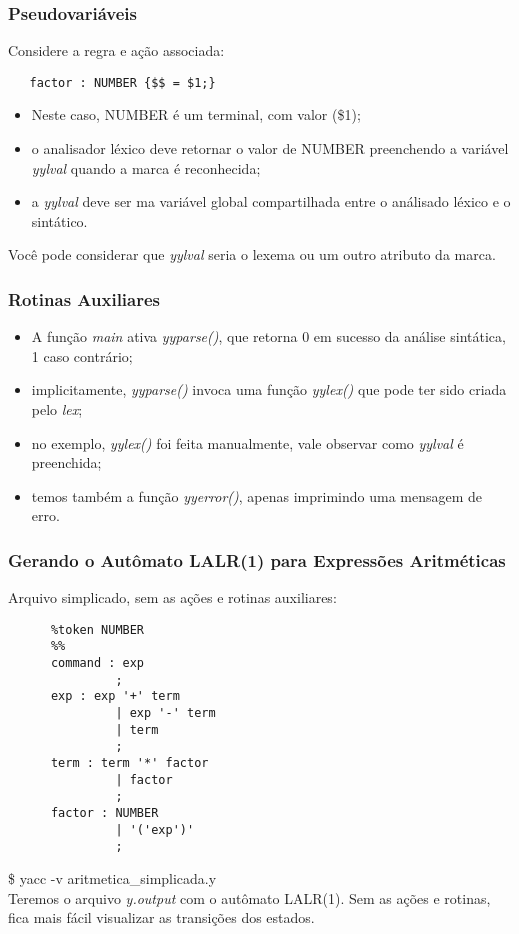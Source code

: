 \documentclass[table]{beamer}
\begin{document}
\begin{frame}[fragile]
   \frametitle{Pseudovariáveis}
   Considere a regra e ação associada:
   \begin{verbatim}
   factor : NUMBER {$$ = $1;}
   \end{verbatim}
   \begin{itemize}
      \item Neste caso, NUMBER é um terminal, com valor (\$1);
      \item o analisador léxico deve retornar o valor de NUMBER preenchendo a variável \textit{yylval} quando a marca é reconhecida;
      \item a \textit{yylval} deve ser ma variável global compartilhada entre o análisado léxico e o sintático.
   \end{itemize}
   Você pode considerar que \textit{yylval} seria o lexema ou um outro atributo da marca.
\end{frame}

\begin{frame}
   \frametitle{Rotinas Auxiliares}
   \begin{itemize}
      \item A função \textit{main} ativa \textit{yyparse()}, que retorna 0 em sucesso da análise sintática, 1 caso contrário;
      \item implicitamente, \textit{yyparse()} invoca uma função \textit{yylex()} que pode ter sido criada pelo \textit{lex};
      \item no exemplo, \textit{yylex()} foi feita manualmente, vale observar como \textit{yylval} é preenchida;
      \item temos também a função \textit{yyerror()}, apenas imprimindo uma mensagem de erro.
   \end{itemize}
\end{frame}

\begin{frame} [fragile]
   \frametitle{Gerando o Autômato LALR(1) para Expressões Aritméticas}
   Arquivo simplicado, sem as ações e rotinas auxiliares:
   \scriptsize
   \begin{verbatim}
      %token NUMBER
      %% 
      command : exp
               ; 
      exp : exp '+' term 
               | exp '-' term 
               | term 
               ;
      term : term '*' factor 
               | factor 
               ;      
      factor : NUMBER 
               | '('exp')' 
               ;  
   \end{verbatim}
   \normalsize
   \$ yacc -v aritmetica\_simplicada.y \\
   Teremos o arquivo \textit{y.output} com o autômato LALR(1). Sem as ações e rotinas, fica mais fácil visualizar as transições dos estados.
\end{frame}
\end{document}
